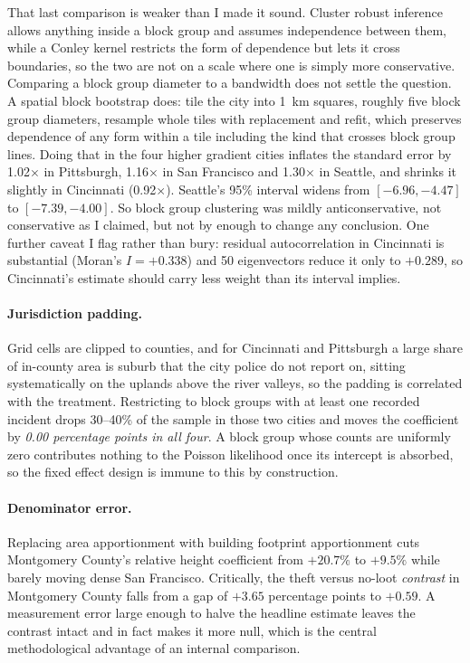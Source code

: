 \documentclass[12pt,letterpaper]{article}
\begin{document}
That last comparison is weaker than I made it sound. Cluster robust inference allows
anything inside a block group and assumes independence between them, while a Conley
kernel restricts the form of dependence but lets it cross boundaries, so the two are
not on a scale where one is simply more conservative. Comparing a block group diameter
to a bandwidth does not settle the question. A spatial block bootstrap does: tile the
city into 1~km squares, roughly five block group diameters, resample whole tiles with
replacement and refit, which preserves dependence of any form within a tile including
the kind that crosses block group lines. Doing that in the four higher gradient cities
inflates the standard error by 1.02$\times$ in Pittsburgh, 1.16$\times$ in San
Francisco and 1.30$\times$ in Seattle, and shrinks it slightly in Cincinnati
(0.92$\times$). Seattle's 95\% interval widens from $[-6.96, -4.47]$ to
$[-7.39, -4.00]$. So block group clustering was mildly anticonservative, not
conservative as I claimed, but not by enough to change any conclusion. One further
caveat I flag rather than bury:
residual autocorrelation in Cincinnati is substantial (Moran's $I = +0.338$) and 50
eigenvectors reduce it only to $+0.289$, so Cincinnati's estimate should carry less
weight than its interval implies.

\paragraph{Jurisdiction padding.} Grid cells are clipped to counties, and for
Cincinnati and Pittsburgh a large share of in-county area is suburb that the city
police do not report on, sitting systematically on the uplands above the river
valleys, so the padding is correlated with the treatment. Restricting to block groups
with at least one recorded incident drops 30--40\% of the sample in those two cities
and moves the coefficient by \emph{0.00 percentage points in all four}. A block group
whose counts are uniformly zero contributes nothing to the Poisson likelihood once its
intercept is absorbed, so the fixed effect design is immune to this by construction.

\paragraph{Denominator error.} Replacing area apportionment with building footprint
apportionment cuts Montgomery County's relative height coefficient from $+20.7\%$ to
$+9.5\%$ while barely moving dense San Francisco. Critically, the theft versus no-loot
\emph{contrast} in Montgomery County falls from a gap of $+3.65$ percentage points to
$+0.59$. A measurement error large enough to halve the headline estimate leaves the
contrast intact and in fact makes it more null, which is the central methodological
advantage of an internal comparison.
\end{document}
